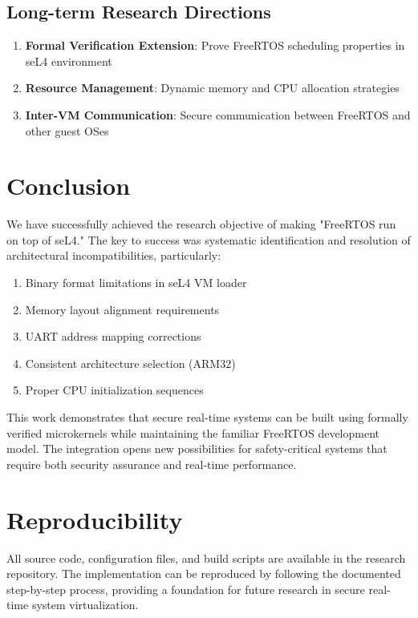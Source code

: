 \documentclass[12pt]{article}
\begin{document}
\subsection{Long-term Research Directions}

\begin{enumerate}
\item \textbf{Formal Verification Extension}: Prove FreeRTOS scheduling properties in seL4 environment
\item \textbf{Resource Management}: Dynamic memory and CPU allocation strategies
\item \textbf{Inter-VM Communication}: Secure communication between FreeRTOS and other guest OSes
\end{enumerate}

\section{Conclusion}

We have successfully achieved the research objective of making "FreeRTOS run on top of seL4." The key to success was systematic identification and resolution of architectural incompatibilities, particularly:

\begin{enumerate}
\item Binary format limitations in seL4 VM loader
\item Memory layout alignment requirements  
\item UART address mapping corrections
\item Consistent architecture selection (ARM32)
\item Proper CPU initialization sequences
\end{enumerate}

This work demonstrates that secure real-time systems can be built using formally verified microkernels while maintaining the familiar FreeRTOS development model. The integration opens new possibilities for safety-critical systems that require both security assurance and real-time performance.

\section{Reproducibility}

All source code, configuration files, and build scripts are available in the research repository. The implementation can be reproduced by following the documented step-by-step process, providing a foundation for future research in secure real-time system virtualization.



\end{document}
